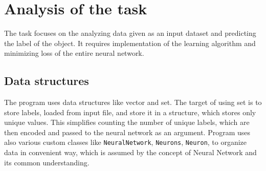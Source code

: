 \documentclass[12pt,a4paper,twoside]{article}
\let\oldmarginpar\marginpar
\renewcommand\marginpar[1]{%
  {\linespread{0.85}\normalfont\scriptsize%
\oldmarginpar[\hspace{1cm}\begin{minipage}{3cm}\raggedleft\scriptsize\color{black}\textsf{#1}\end{minipage}]%
{\hspace{0cm}\begin{minipage}{3cm}\raggedright\scriptsize\color{black}\textsf{#1}\end{minipage}}%
}%
}
\begin{document}

\section{Analysis of the task}

The task focuses on the analyzing data given as an input dataset and predicting the label of the object. It requires implementation of the learning algorithm and minimizing loss of the entire neural network.

\subsection{Data structures}
The program uses data structures like vector and set. The target of using set is to store labels, loaded from input file, and store it in a structure, which stores only unique values. This simplifies counting the number of unique labels, which are then encoded and passed to the neural network as an argument. Program uses also various custom classes like \lstinline|NeuralNetwork|, \lstinline|Neurons|,  \lstinline|Neuron|, to organize data in convenient way, which is assumed by the concept of Neural Network and its common understanding.
\end{document}
